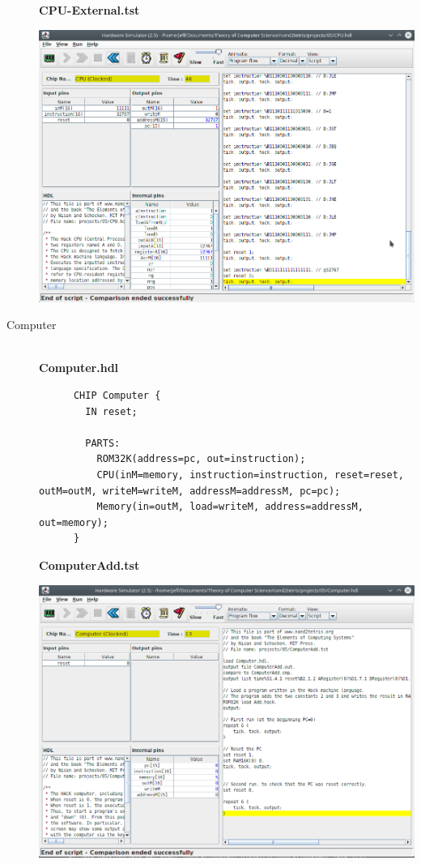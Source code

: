 \documentclass[titlepage]{article}
\begin{document}
\begin{description}
{    \textbf{CPU-External.tst}

    \includegraphics[width=.9\textwidth]{cpu-external.png}
  }
  \item[Computer]{\\

    \textbf{Computer.hdl}

    \begin{lstlisting}
      CHIP Computer {
        IN reset;

        PARTS:
          ROM32K(address=pc, out=instruction);
          CPU(inM=memory, instruction=instruction, reset=reset, outM=outM, writeM=writeM, addressM=addressM, pc=pc);
          Memory(in=outM, load=writeM, address=addressM, out=memory);
      }
    \end{lstlisting}

    \textbf{ComputerAdd.tst}

    \includegraphics[width=.9\textwidth]{computer-add.png}

}
\end{description}
\end{document}
